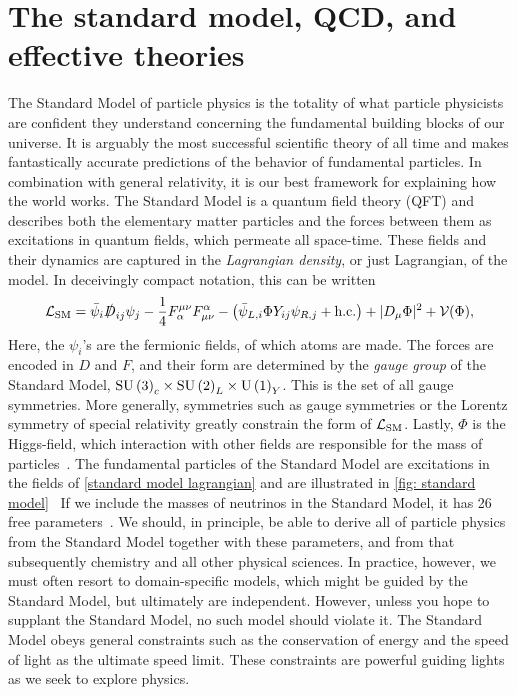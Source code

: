 \section{The standard model, QCD, and effective theories}


The Standard Model of particle physics is the totality of what particle physicists are confident they understand concerning the fundamental building blocks of our universe.
It is arguably the most successful scientific theory of all time and makes fantastically accurate predictions of the behavior of fundamental particles.
In combination with general relativity, it is our best framework for explaining how the world works.
The Standard Model is a quantum field theory (QFT) and describes both the elementary matter particles and the forces between them as excitations in quantum fields, which permeate all space-time.
These fields and their dynamics are captured in the \emph{Lagrangian density}, or just Lagrangian, of the model.
In deceivingly compact notation, this can be written
%
\begin{equation}
    \label{standard model lagrangian}
    \mathcal{L}_\text{SM}
    =
    \bar \psi_i \slashed{ D }_{ij}  \psi_j
    - \frac{1}{4} F_\alpha^{\mu\nu} F^\alpha_{\mu \nu}
    - \left( 
        \bar \psi_{L, i} \Phi Y_{ij} \psi_{R, j}
        + \text{h.c.}
    \right)
    + |D_{\mu} \Phi |^2 + \mathcal{V}(\Phi),
\end{equation}
%
Here, the $\psi_i$'s are the fermionic fields, of which atoms are made.
The forces are encoded in $D$ and $F$, and their form are determined by the \emph{gauge group} of the Standard Model, $ \text{SU}\left(3\right)_c\times \text{SU}\left(2\right)_L\times \text{U}\left(1\right)_Y$.
This is the set of all gauge symmetries.
More generally, symmetries such as gauge symmetries or the Lorentz symmetry of special relativity greatly constrain the form of $\mathcal{L}_\text{SM}$.
Lastly, $\Phi$ is the Higgs-field, which interaction with other fields are responsible for the mass of particles~\autocite{carrollWorldEverydayExperience2013,schwartzQuantumFieldTheory2013}.
The fundamental particles of the Standard Model are excitations in the fields of \autoref{standard model lagrangian} and are illustrated in \autoref{fig: standard model}~\autocite{griffithsIntroductionElementaryParticles2008,schwartzQuantumFieldTheory2013}
If we include the masses of neutrinos in the Standard Model, it has 26 free parameters~\autocite{kramerStandardModelParticle2017}.
We should, in principle, be able to derive all of particle physics from the Standard Model together with these parameters, and from that subsequently chemistry and all other physical sciences.
In practice, however, we must often resort to domain-specific models, which might be guided by the Standard Model, but ultimately are independent.
However, unless you hope to supplant the Standard Model, no such model should violate it.
The Standard Model obeys general constraints such as the conservation of energy and the speed of light as the ultimate speed limit.
These constraints are powerful guiding lights as we seek to explore physics.



